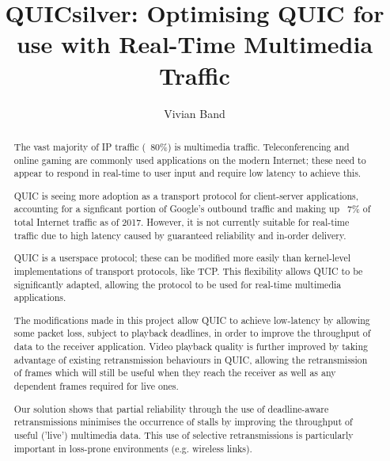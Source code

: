 \documentclass{mpaper}
\begin{document}
\title{QUICsilver: Optimising QUIC for use with Real-Time Multimedia Traffic}
\author{Vivian Band}

\maketitle

\begin{abstract}
  The vast majority of IP traffic (~80\%) is multimedia traffic. Teleconferencing and online gaming are commonly used applications on the modern Internet; these need to appear to respond in real-time to user input and require low latency to achieve this.
  
  QUIC is seeing more adoption as a transport protocol for client-server applications, accounting for a signficant portion of Google's outbound traffic and making up ~7\% of total Internet traffic as of 2017. However, it is not currently suitable for real-time traffic due to high latency caused by guaranteed reliability and in-order delivery.
  
  QUIC is a userspace protocol; these can be modified more easily than kernel-level implementations of transport protocols, like TCP. This flexibility allows QUIC to be significantly adapted, allowing the protocol to be used for real-time multimedia applications.
  
  The modifications made in this project allow QUIC to achieve low-latency by allowing some packet loss, subject to playback deadlines, in order to improve the throughput of data to the receiver application. Video playback quality is further improved by taking advantage of existing retransmission behaviours in QUIC, allowing the retransmission of frames which will still be useful when they reach the receiver as well as any dependent frames required for live ones.
  
  Our solution shows that partial reliability through the use of deadline-aware retransmissions minimises the occurrence of stalls by improving the throughput of useful ('live') multimedia data. This use of selective retransmissions is particularly important in loss-prone environments (e.g. wireless links).
  

\end{abstract}

\end{document}
